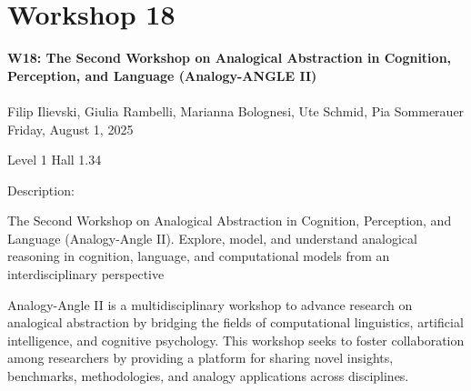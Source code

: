 \clearpage



\section[W18: The Second Workshop on Analogical Abstraction in Cognition, Perception, and Language (Analogy-ANGLE II)]{Workshop 18}
\label{workshop_18}

\begin{center}
    {\Large \textbf{W18: The Second Workshop on Analogical Abstraction in Cognition, Perception, and Language (Analogy-ANGLE II)}}\\
    \\


  Filip Ilievski, Giulia Rambelli, Marianna Bolognesi, Ute Schmid, Pia Sommerauer\\

    Friday, August 1, 2025
    
   Level 1 Hall 1.34
\end{center}

Description: 

The Second Workshop on Analogical Abstraction in Cognition, Perception, and Language (Analogy-Angle II). 
Explore, model, and understand analogical reasoning in cognition, language, and computational models from an interdisciplinary perspective

Analogy-Angle II is a multidisciplinary workshop to advance research on analogical abstraction by bridging the fields of computational linguistics, artificial intelligence, and cognitive psychology. This workshop seeks to foster collaboration among researchers by providing a platform for sharing novel insights, benchmarks, methodologies, and analogy applications across disciplines.



